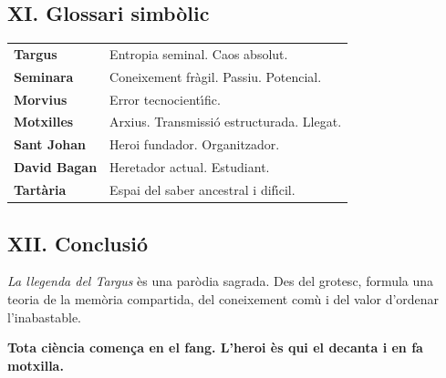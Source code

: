 \subsection*{XI. Glossari simb\`olic}
\begin{tabular}{ll}
\textbf{Targus} & Entropia seminal. Caos absolut. \\
\textbf{Seminara} & Coneixement fr\`agil. Passiu. Potencial. \\
\textbf{Morvius} & Error tecnocient\'\i fic. \\
\textbf{Motxilles} & Arxius. Transmissi\'o estructurada. Llegat. \\
\textbf{Sant Johan} & Heroi fundador. Organitzador. \\
\textbf{David Bagan} & Heretador actual. Estudiant. \\
\textbf{Tart\`aria} & Espai del saber ancestral i dif\'\i cil. \\
\end{tabular}

\subsection*{XII. Conclusi\'o}
\textit{La llegenda del Targus} \`es una par\`odia sagrada. Des del grotesc, formula una teoria de la mem\`oria compartida, del coneixement com\`u i del valor d’ordenar l’inabastable.

\vspace{1em}
\textbf{Tota ci\`encia comença en el fang. L’heroi \`es qui el decanta i en fa motxilla.}